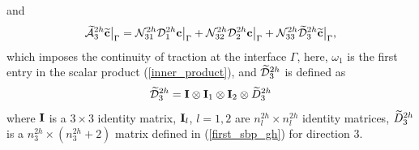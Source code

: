 and
\begin{equation}\label{hatAc}
\wt{\mathcal{A}}_3^{2h}\wt{\bf c}\big|_\Gamma = \mathcal{N}_{31}^{2h}\mathcal{D}^{2h}_1{\bf c}\big|_\Gamma + \mathcal{N}_{32}^{2h}\mathcal{D}^{2h}_2{\bf c}\big|_\Gamma + \mathcal{N}_{33}^{2h}\wt{\mathcal D}^{2h}_3\wt{\bf c}\big|_\Gamma,
\end{equation}
 which imposes the continuity of traction at the interface $\Gamma$, here, $\omega_1$ is the first entry in the scalar product (\ref{inner_product}), and $\widetilde{\mathcal{D}}_3^{2h}$ is defined as
 \[\widetilde{\mathcal{D}}_3^{2h} = {\bf I}\otimes {\bf I}_1 \otimes {\bf I}_2 \otimes \widetilde{D}_3^{2h}\]
 where ${\bf I}$ is a $3\times3$ identity matrix, ${\bf I}_l$, $l = 1,2$ are $n_l^{2h}\times n_l^{2h}$ identity matrices, $\widetilde{D}_3^{2h}$ is a $n_3^{2h}\times (n_3^{2h}+2)$ matrix defined in (\ref{first_sbp_gh}) for direction $3$.

